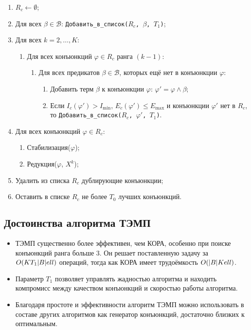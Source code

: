 \begin{enumerate}
    \item $R_c \gets \emptyset$;
    \item Для всех $\beta \in \mathcal{B}$: \texttt{Добавить\_в\_список($R_c$, $\beta$, $T_1$)};
    \item Для всех $k = 2, \dots, K$:
    \begin{enumerate}
        \item Для всех конъюнкций $\varphi \in R_c$ ранга $(k-1)$:
        \begin{enumerate}
            \item Для всех предикатов $\beta \in \mathcal{B}$, которых ещё нет в конъюнкции $\varphi$:
            \begin{enumerate}
                \item Добавить терм $\beta$ к конъюнкции $\varphi$: $\varphi' = \varphi \land \beta$;
                \item Если $I_c(\varphi') > I_{\min}$, $E_c(\varphi') \leq E_{\max}$ и конъюнкции $\varphi'$ нет в $R_c$, то \texttt{Добавить\_в\_список($R_c$, $\varphi'$, $T_1$)}.
            \end{enumerate}
        \end{enumerate}
    \end{enumerate}
    \item Для всех конъюнкций $\varphi \in R_c$:
    \begin{enumerate}
        \item Стабилизация($\varphi$);
        \item Редукция($\varphi$, $X^k$);
    \end{enumerate}
    \item Удалить из списка $R_c$ дублирующие конъюнкции;
    \item Оставить в списке $R_c$ не более $T_0$ лучших конъюнкций.
\end{enumerate}


\subsection{Достоинства алгоритма ТЭМП}

\begin{itemize}
    \item ТЭМП существенно более эффективен, чем КОРА, особенно при поиске конъюнкций ранга больше 3. Он решает поставленную задачу за $O(KT_1|B|\\ell)$ операций, тогда как КОРА имеет трудоёмкость $O(|B|K\\ell)$.
    \item Параметр $T_1$ позволяет управлять жадностью алгоритма и находить компромисс между качеством конъюнкций и скоростью работы алгоритма.
    \item Благодаря простоте и эффективности алгоритм ТЭМП можно использовать в составе других алгоритмов как генератор конъюнкций, достаточно близких к оптимальным.
\end{itemize}

